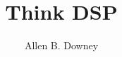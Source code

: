 \documentclass[12pt]{book}
\title{Think DSP}
\author{Allen B. Downey}
\newif\ifplastex
\begin{document}
\frontmatter



\ifplastex
    \usepackage{localdef}
    \maketitle

\newcount\anchorcnt
\newcommand*{\Anchor}[1]{%
  \@bsphack%
    \Hy@GlobalStepCount\anchorcnt%
    \edef\@currentHref{anchor.\the\anchorcnt}%
    \Hy@raisedlink{\hyper@anchorstart{\@currentHref}\hyper@anchorend}%
    \M@gettitle{}\label{#1}%
    \@esphack%
}


\else


  {\topsep}%
  {\topsep}%
  {}%
  {}%
  {\bfseries}%
  {}%
  { }%
  {}%

\theoremstyle{exercise}
\newtheorem{exercise}{Exercise}[chapter]


\end{document}
